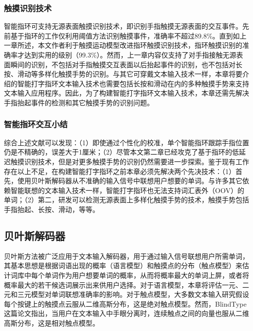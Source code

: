 \subsubsection{触摸识别技术}

智能指环可支持无源表面触摸识别技术，即识别手指触摸无源表面的交互事件。先前基于指环的工作仅利用阈值方法识别触摸事件\cite{lam2002mids, oh2017anywheretouch, masson2017whichfingers}，准确率不超过89.8\%。直到如上一章所述，本文作者利于触摸运动模型改进指环触摸识别技术\cite{gu2019accurate}，指环触摸识别的准确率才达到实用的级别（99.3\%）。然而，上一章内容仅支持了对手指接触无源表面瞬间的识别，不包括对手指触摸交互表面以后抬起事件的识别，也不包括对长按、滑动等多样化触摸手势的识别。与其它可穿戴文本输入技术\cite{xu2019tiptext, yi2017too, yu2017tap}一样，本章将要介绍的智能打字指环文本输入技术也需要包括长按和滑动在内的多种触摸手势来支持文本输入应用程序。因此，为了构建智能打字指环文本输入技术，本章还需先解决手指抬起事件的检测和其它触摸手势的识别问题。

\subsubsection{智能指环交互小结}

综合上述文献可以发现：（1）即使通过个性化的校准\cite{kienzle2014lightring}，单个智能指环跟踪手指位置仍是不精确的，误差大于1厘米；（2）尽管本文第二章已经攻克了基于指环的低延迟触摸识别技术，但是对更多触摸手势的识别仍然需要进一步探索。鉴于现有工作存在以上不足，在构建智能打字指环之前本章必须先解决两个先决技术：（1）首先，使用贝叶斯解码器从不准确的输入信号中联想用户想要的单词。与许多其它依赖智能联想的文本输入技术一样\cite{gong2018wristext, gordon2016watchwriter, gupta2019rotoswype, markussen2014vulture}，智能打字指环也无法支持词汇表外（OOV）的单词；（2）第二，研发可以检测无源表面上多样化触摸手势的技术，触摸手势包括手指抬起、长按、滑动，等等。

\subsection{贝叶斯解码器}

贝叶斯方法被广泛应用于文本输入解码器，用于通过输入信号联想用户所需单词\cite{goodman2002language}，其基本思想是根据词语出现的概率（语言模型）和触摸点的分布（触点模型）来估计词库中每个单词作为用户想要单词的概率，从而将概率最大的单词上屏，或者将概率最大的若干候选词展示出来供用户选择。对于语言模型，本章将评估一元、二元和三元模型\cite{ide2008american}对单词联想准确率的影响。对于触点模型，大多数文本输入研究假设每个按键上的触摸点云服从二维高斯分布，这是绝对触点模型\cite{azenkot2012touch, goodman2002language}。然而，BlindType这篇论文\cite{lu2017blindtype}指出，当用户在文本输入中手眼分离时，连续触点之间的向量也服从二维高斯分布，这是相对触点模型。


